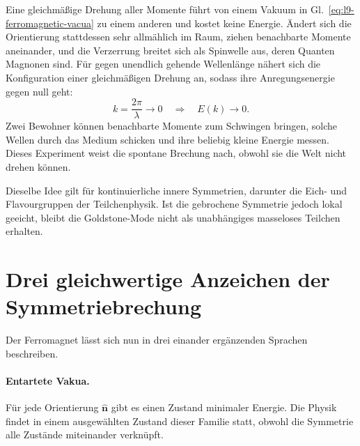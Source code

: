Eine gleichmäßige Drehung aller Momente führt von einem Vakuum in Gl.~\eqref{eq:l9-ferromagnetic-vacua} zu einem anderen und kostet keine Energie. Ändert sich die Orientierung stattdessen sehr allmählich im Raum, ziehen benachbarte Momente aneinander, und die Verzerrung breitet sich als Spinwelle aus, deren Quanten Magnonen sind. Für gegen unendlich gehende Wellenlänge nähert sich die Konfiguration einer gleichmäßigen Drehung an, sodass ihre Anregungsenergie gegen null geht:
\begin{equation}
k=\frac{2\pi}{\lambda}\longrightarrow0
\quad\Longrightarrow\quad
E(k)\longrightarrow0.
\label{eq:l9-gapless-magnon}
\end{equation}
Zwei Bewohner können benachbarte Momente zum Schwingen bringen, solche Wellen durch das Medium schicken und ihre beliebig kleine Energie messen. Dieses Experiment weist die spontane Brechung nach, obwohl sie die Welt nicht drehen können.


Dieselbe Idee gilt für kontinuierliche innere Symmetrien, darunter die Eich- und Flavourgruppen der Teilchenphysik. Ist die gebrochene Symmetrie jedoch lokal geeicht, bleibt die Goldstone-Mode nicht als unabhängiges masseloses Teilchen erhalten.

\begin{classroomqa}
\end{classroomqa}

\section{Drei gleichwertige Anzeichen der Symmetriebrechung}

Der Ferromagnet lässt sich nun in drei einander ergänzenden Sprachen beschreiben.

\paragraph{Entartete Vakua.}
Für jede Orientierung \(\hat{\mathbf n}\) gibt es einen Zustand minimaler Energie. Die Physik findet in einem ausgewählten Zustand dieser Familie statt, obwohl die Symmetrie alle Zustände miteinander verknüpft.

